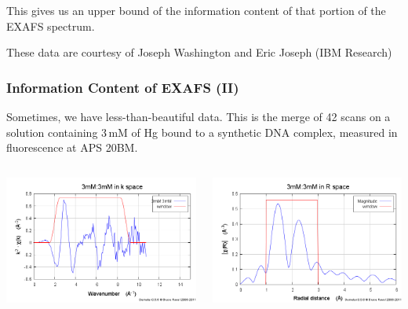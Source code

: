 \documentclass[10pt, xcolor=x11names, compress]{beamer}
\begin{document}
\begin{frame}
  ~\\[-7ex]
  ~

  \begin{exampleblock}{}
    \begin{center}
      This gives us an upper bound of the information content of that
      portion of the EXAFS spectrum.
    \end{center}
  \end{exampleblock}
  \begin{bottomnote}[0.4][19.25]%
    These data are courtesy of Joseph Washington and Eric
    Joseph (IBM Research)
  \end{bottomnote}
\end{frame}

\begin{frame}
  \frametitle{Information Content of EXAFS (II)}
  \small
  Sometimes, we have less-than-beautiful data.  This is the merge of 42
  scans on a solution containing 3\,mM of Hg bound to a synthetic DNA
  complex, measured in fluorescence at APS 20BM.
  \begin{columns}
    \begin{column}{0.5\linewidth}
      \begin{center}
        \includegraphics[width=0.8\linewidth]{info/hgdna_chik.png}
      \end{center}
    \end{column}
    \begin{column}{0.5\linewidth}
      \begin{center}
        \includegraphics[width=0.8\linewidth]{info/hgdna_chir.png}

\end{center}
\end{column}
\end{columns}
\end{frame}
\end{document}

